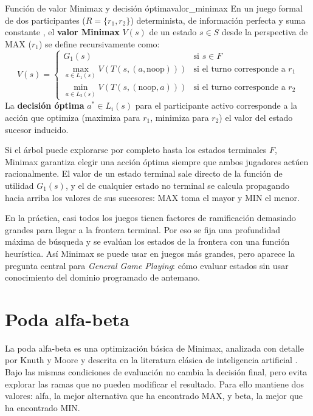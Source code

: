 \begin{definicion}{Función de valor Minimax y decisión óptima}{valor_minimax}
En un juego formal de dos participantes ($R = \{r_1, r_2\}$) determinista, de información perfecta y suma constante \cite{VonNeumann1928, Shannon1950, RussellNorvig2010}, el \textbf{valor Minimax} $V(s)$ de un estado $s \in S$ desde la perspectiva de MAX ($r_1$) se define recursivamente como:
\begin{equation}
    V(s) = \begin{cases} 
    G_1(s) & \text{si } s \in F \\ 
    \max_{a \in L_1(s)} V(T(s, (a, \text{noop}))) & \text{si el turno corresponde a } r_1 \\ 
    \min_{a \in L_2(s)} V(T(s, (\text{noop}, a))) & \text{si el turno corresponde a } r_2 
    \end{cases}
    \label{eq:recurrencia-minimax}
\end{equation}
La \textbf{decisión óptima} $a^* \in L_i(s)$ para el participante activo corresponde a la acción que optimiza (maximiza para $r_1$, minimiza para $r_2$) el valor del estado sucesor inducido.
\end{definicion}

Si el árbol puede explorarse por completo hasta los estados terminales $F$, Minimax garantiza elegir una acción óptima siempre que ambos jugadores actúen racionalmente. El valor de un estado terminal sale directo de la función de utilidad $G_1(s)$, y el de cualquier estado no terminal se calcula propagando hacia arriba los valores de sus sucesores: MAX toma el mayor y MIN el menor.

En la práctica, casi todos los juegos tienen factores de ramificación demasiado grandes para llegar a la frontera terminal. Por eso se fija una profundidad máxima de búsqueda y se evalúan los estados de la frontera con una función heurística. Así Minimax se puede usar en juegos más grandes, pero aparece la pregunta central para \textit{General Game Playing}: cómo evaluar estados sin usar conocimiento del dominio programado de antemano.

\section{Poda alfa-beta}

La poda alfa-beta es una optimización básica de Minimax, analizada con detalle por Knuth y Moore \cite{KnuthMoore1975} y descrita en la literatura clásica de inteligencia artificial \cite{RussellNorvig2010}. Bajo las mismas condiciones de evaluación no cambia la decisión final, pero evita explorar las ramas que no pueden modificar el resultado. Para ello mantiene dos valores: alfa, la mejor alternativa que ha encontrado MAX, y beta, la mejor que ha encontrado MIN.

